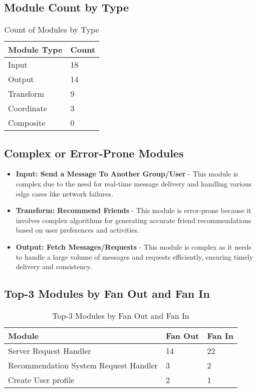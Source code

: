 \documentclass[12pt,a4paper]{article}
\begin{document}
\subsection{Module Count by Type}
\begin{table}[H]
    \centering
    \renewcommand{\arraystretch}{1.25}
    \begin{tabular}{|p{4cm}|p{4cm}|}
        \hline
        \textbf{Module Type} & \textbf{Count} \\
        \hline
        Input & 18 \\
        \hline
        Output & 14 \\
        \hline
        Transform & 9 \\
        \hline
        Coordinate & 3 \\
        \hline
        Composite & 0 \\
        \hline
    \end{tabular}
    \caption{Count of Modules by Type}
\end{table}

\subsection{Complex or Error-Prone Modules}
\begin{itemize}
    \item \textbf{Input: Send a Message To Another Group/User} - This module is complex due to the need for real-time message delivery and handling various edge cases like network failures.
    \item \textbf{Transform: Recommend Friends} - This module is error-prone because it involves complex algorithms for generating accurate friend recommendations based on user preferences and activities.
    \item \textbf{Output: Fetch Messages/Requests} - This module is complex as it needs to handle a large volume of messages and requests efficiently, ensuring timely delivery and consistency.
\end{itemize}

\subsection{Top-3 Modules by Fan Out and Fan In}
\begin{table}[H]
    \centering
    \renewcommand{\arraystretch}{1.25}
    \begin{tabular}{|p{4cm}|p{2cm}|p{2cm}|}
        \hline
        \textbf{Module} & \textbf{Fan Out} & \textbf{Fan In} \\
        \hline
        Server Request Handler & 14 & 22 \\
        \hline
        Recommendation System Request Handler & 3 & 2 \\
        \hline
        Create User profile & 2 & 1 \\
        \hline
    \end{tabular}
    \caption{Top-3 Modules by Fan Out and Fan In}
\end{table}
\end{document}
